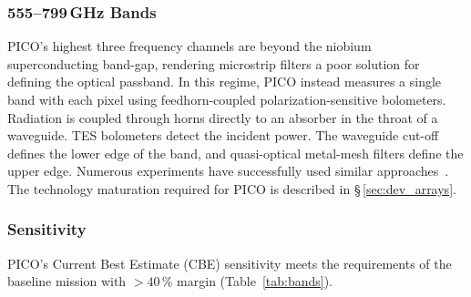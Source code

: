 

\subsubsection{555--799\,GHz Bands}
\label{sec:high_freq_det} %

PICO's highest three frequency channels are beyond the niobium superconducting band-gap, rendering microstrip filters a poor solution for defining the optical passband. In this regime, PICO instead measures a single band with each pixel using feedhorn-coupled polarization-sensitive bolometers. Radiation is coupled through horns directly to an absorber in the throat of a waveguide. TES bolometers detect the incident power.  The waveguide cut-off defines the lower edge of the band, and quasi-optical metal-mesh filters define the upper edge. Numerous experiments have successfully used similar approaches~\citep{Shirokoff2011,Bleem2012,Turner2001}. The technology maturation required for PICO is described in \S\,\ref{sec:dev_arrays}.



\subsubsection{Sensitivity}
\label{sec:sensitivity} %

PICO's Current Best Estimate (CBE) sensitivity meets the requirements of the baseline mission with \hbox{$>40\,\%$} margin (Table~\ref{tab:bands}).

